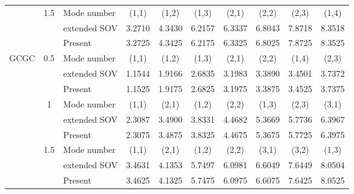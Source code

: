 \documentclass[preprint,12pt]{elsarticle}
\begin{document}
\begin{table}[!htbp]
\begin{tabular}{c c l c c c c c c c}
		& 1.5 & Mode number & (1,1) & (1,2) & (1,3) & (2,1) & (2,2) & (2,3) & (1,4) \\
		&     & extended SOV \Citealp{xing2020extended}   & 3.2710 & 4.3430 & 6.2157 & 6.3337 & 6.8043 & 7.8718 & 8.3518 \\
		&     & Present      & 3.2725 & 4.3425 & 6.2175 & 6.3325 & 6.8025 & 7.8725 & 8.3525 \\
		GCGC & 0.5 & Mode number & (1,1) & (1,2) & (1,3) & (2,1) & (2,2) & (1,4) & (2,3) \\
		&     & extended SOV \Citealp{xing2020extended}   & 1.1544 & 1.9166 & 2.6835 & 3.1983 & 3.3890 & 3.4501 & 3.7372 \\
		&     & Present      & 1.1525 & 1.9175 & 2.6825 & 3.1975 & 3.3875 & 3.4525 & 3.7375 \\
		& 1   & Mode number  & (1,1) & (2,1) & (1,2) & (2,2) & (1,3) & (2,3) & (3,1) \\
		&     & extended SOV \Citealp{xing2020extended}   & 2.3087 & 3.4900 & 3.8331 & 4.4682 & 5.3669 & 5.7736 & 6.3967 \\
		&     & Present       & 2.3075 & 3.4875 & 3.8325 & 4.4675 & 5.3675 & 5.7725 & 6.3975 \\
		& 1.5 & Mode number  & (1,1) & (2,1) & (1,2) & (2,2) & (3,1) & (3,2) & (1,3) \\
		&     & extended SOV \Citealp{xing2020extended}   & 3.4631 & 4.1353 & 5.7497 & 6.0981 & 6.6049 & 7.6449 & 8.0504 \\
		&     & Present       & 3.4625 & 4.1325 & 5.7475 & 6.0975 & 6.6075 & 7.6425 & 8.0525 \\
		\bottomrule
	\end{tabular}
	\label{tab:sov1}
\end{table}
\end{document}
